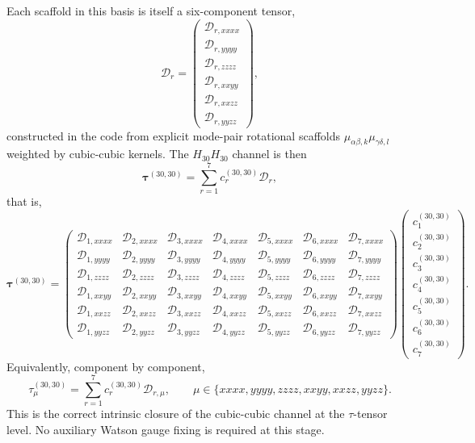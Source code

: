 \documentclass[11pt]{article}
\begin{document}
Each scaffold in this basis is itself a six-component tensor,
\begin{equation}
\mathcal{D}_r =
\begin{pmatrix}
\mathcal{D}_{r,xxxx} \\
\mathcal{D}_{r,yyyy} \\
\mathcal{D}_{r,zzzz} \\
\mathcal{D}_{r,xxyy} \\
\mathcal{D}_{r,xxzz} \\
\mathcal{D}_{r,yyzz}
\end{pmatrix},
\end{equation}
constructed in the code from explicit mode-pair rotational scaffolds
$\mu_{\alpha\beta,k}\mu_{\gamma\delta,l}$ weighted by cubic-cubic kernels.
The $H_{30}H_{30}$ channel is then
\begin{equation}
\bm{\tau}^{(30,30)} = \sum_{r=1}^{7} c_r^{(30,30)} \mathcal{D}_r,
\end{equation}
that is,
\begin{equation}
\bm{\tau}^{(30,30)} =
\begin{pmatrix}
\mathcal{D}_{1,xxxx} & \mathcal{D}_{2,xxxx} & \mathcal{D}_{3,xxxx} & \mathcal{D}_{4,xxxx} & \mathcal{D}_{5,xxxx} & \mathcal{D}_{6,xxxx} & \mathcal{D}_{7,xxxx} \\
\mathcal{D}_{1,yyyy} & \mathcal{D}_{2,yyyy} & \mathcal{D}_{3,yyyy} & \mathcal{D}_{4,yyyy} & \mathcal{D}_{5,yyyy} & \mathcal{D}_{6,yyyy} & \mathcal{D}_{7,yyyy} \\
\mathcal{D}_{1,zzzz} & \mathcal{D}_{2,zzzz} & \mathcal{D}_{3,zzzz} & \mathcal{D}_{4,zzzz} & \mathcal{D}_{5,zzzz} & \mathcal{D}_{6,zzzz} & \mathcal{D}_{7,zzzz} \\
\mathcal{D}_{1,xxyy} & \mathcal{D}_{2,xxyy} & \mathcal{D}_{3,xxyy} & \mathcal{D}_{4,xxyy} & \mathcal{D}_{5,xxyy} & \mathcal{D}_{6,xxyy} & \mathcal{D}_{7,xxyy} \\
\mathcal{D}_{1,xxzz} & \mathcal{D}_{2,xxzz} & \mathcal{D}_{3,xxzz} & \mathcal{D}_{4,xxzz} & \mathcal{D}_{5,xxzz} & \mathcal{D}_{6,xxzz} & \mathcal{D}_{7,xxzz} \\
\mathcal{D}_{1,yyzz} & \mathcal{D}_{2,yyzz} & \mathcal{D}_{3,yyzz} & \mathcal{D}_{4,yyzz} & \mathcal{D}_{5,yyzz} & \mathcal{D}_{6,yyzz} & \mathcal{D}_{7,yyzz}
\end{pmatrix}
\begin{pmatrix}
c_1^{(30,30)} \\
c_2^{(30,30)} \\
c_3^{(30,30)} \\
c_4^{(30,30)} \\
c_5^{(30,30)} \\
c_6^{(30,30)} \\
c_7^{(30,30)}
\end{pmatrix}.
\end{equation}
Equivalently, component by component,
\begin{equation}
\tau^{(30,30)}_\mu = \sum_{r=1}^{7} c_r^{(30,30)} \mathcal{D}_{r,\mu},
\qquad
\mu \in \{xxxx,yyyy,zzzz,xxyy,xxzz,yyzz\}.
\end{equation}
This is the correct intrinsic closure of the cubic-cubic channel at the
$\tau$-tensor level. No auxiliary Watson gauge fixing is required at this stage.
\end{document}
